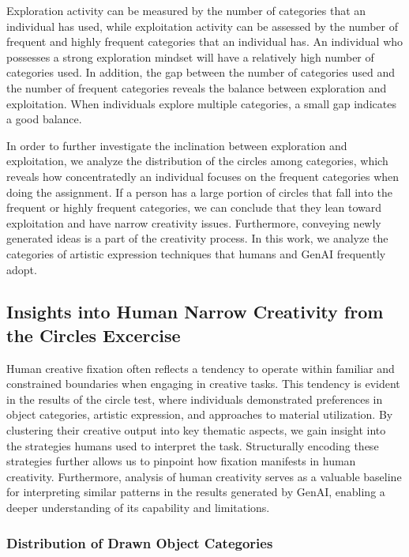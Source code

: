 Exploration activity can be measured by the number of categories that an individual has used, while exploitation activity can be assessed by the number of frequent and highly frequent categories that an individual has. An individual who possesses a strong exploration mindset will have a relatively high number of categories used. In addition, the gap between the number of categories used and the number of frequent categories reveals the balance between exploration and exploitation.
When individuals explore multiple categories, a small gap indicates a good balance.

In order to further investigate the inclination between exploration and exploitation, we analyze the distribution of the circles among categories, which reveals how concentratedly an individual focuses on the frequent categories when doing the assignment. If a person has a large portion of circles that fall into the frequent or highly frequent categories, we can conclude that they lean toward exploitation and have narrow creativity issues.
Furthermore, conveying newly generated ideas is a part of the creativity process. In this work, we analyze the categories of artistic expression techniques that humans and GenAI frequently adopt. 

\subsection{Insights into Human Narrow Creativity from the Circles Excercise}

Human creative fixation often reflects a tendency to operate within familiar and constrained boundaries when engaging in creative tasks.
This tendency is evident in the results of the circle test, where individuals demonstrated preferences in object categories, artistic expression, and approaches to material utilization.
By clustering their creative output into key thematic aspects, we gain insight into the strategies humans used to interpret the task. Structurally encoding these strategies further allows us to pinpoint how fixation manifests in human creativity.
Furthermore, analysis of human creativity serves as a valuable baseline for interpreting similar patterns in the results generated by GenAI, enabling a deeper understanding of its capability and limitations.

\subsubsection{Distribution of Drawn Object Categories}

